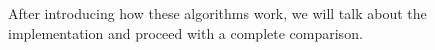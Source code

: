 After introducing how these algorithms work, we will talk about the implementation and proceed with a complete comparison.






